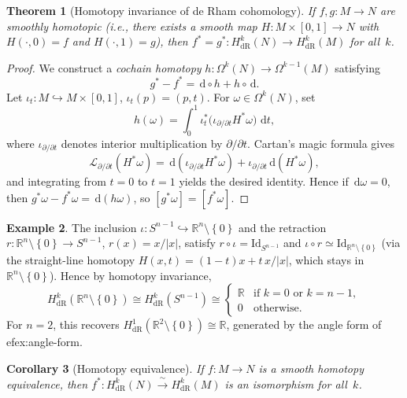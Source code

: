 \documentclass[12pt,a4paper,openany]{book}
\newtheorem{theorem}{Theorem}[section]
\newtheorem{corollary}[theorem]{Corollary}
\theoremstyle{definition}
\newtheorem{example}[theorem]{Example}
\theoremstyle{remark}
\newcommand{\R}{\mathbb{R}}
\newcommand{\Id}{\mathrm{Id}}
\newcommand{\dd}{\,\mathrm{d}}
\newcommand{\abs}[1]{\left\lvert #1 \right\rvert}
\newcommand{\set}[1]{\left\{ #1 \right\}}
\begin{document}
\begin{theorem}[Homotopy invariance of de Rham cohomology]
  \label{thm:homotopy-invariance}
If $f,g\colon M\to N$ are smoothly homotopic (i.e., there exists a smooth
map $H\colon M\times[0,1]\to N$ with $H(\cdot,0) = f$ and $H(\cdot,1)=g$),
then $f^* = g^*\colon H^k_{\mathrm{dR}}(N)\to H^k_{\mathrm{dR}}(M)$ for
all~$k$.
\end{theorem}

\begin{proof}
We construct a \emph{cochain homotopy} $h\colon\Omega^k(N)\to\Omega^{k-1}(M)$
satisfying
\[
  g^* - f^* = \dd\circ h + h\circ\dd.
\]
Let $\iota_t\colon M\hookrightarrow M\times[0,1]$, $\iota_t(p) = (p,t)$.
For $\omega\in\Omega^k(N)$, set
\[
  h(\omega) = \int_0^1 \iota_t^*\bigl(\iota_{\partial/\partial t}
  H^*\omega\bigr)\,\dd t,
\]
where $\iota_{\partial/\partial t}$ denotes interior multiplication by
$\partial/\partial t$.  Cartan's magic formula gives
\[
  \mathcal{L}_{\partial/\partial t}(H^*\omega)
  = \dd(\iota_{\partial/\partial t} H^*\omega)
  + \iota_{\partial/\partial t}\dd(H^*\omega),
\]
and integrating from $t=0$ to $t=1$ yields the desired identity.
Hence if $\dd\omega = 0$, then $g^*\omega - f^*\omega = \dd(h\omega)$,
so $[g^*\omega] = [f^*\omega]$.
\end{proof}

\begin{example}\label{ex:homotopy-invariance-Rn-minus-0}
The inclusion $\iota\colon S^{n-1}\hookrightarrow\R^n\setminus\set{0}$
and the retraction $r\colon\R^n\setminus\set{0}\to S^{n-1}$,
$r(x) = x/\abs{x}$, satisfy $r\circ\iota = \Id_{S^{n-1}}$ and
$\iota\circ r\simeq\Id_{\R^n\setminus\set{0}}$ (via the straight-line
homotopy $H(x,t) = (1-t)x + t\,x/\abs{x}$, which stays in
$\R^n\setminus\set{0}$).  Hence by homotopy invariance,
\[
  H^k_{\mathrm{dR}}(\R^n\setminus\set{0})
  \cong H^k_{\mathrm{dR}}(S^{n-1})
  \cong \begin{cases} \R & \text{if } k = 0 \text{ or } k = n-1, \\
  0 & \text{otherwise.}\end{cases}
\]
For $n = 2$, this recovers $H^1_{\mathrm{dR}}(\R^2\setminus\set{0})\cong\R$,
generated by the angle form of 
ef{ex:angle-form}.
\end{example}

\begin{corollary}[Homotopy equivalence]\label{cor:htpy-equiv}
If $f\colon M\to N$ is a smooth homotopy equivalence, then
$f^*\colon H^k_{\mathrm{dR}}(N)\xrightarrow{\;\sim\;} H^k_{\mathrm{dR}}(M)$
is an isomorphism for all~$k$.
\end{corollary}
\end{document}
